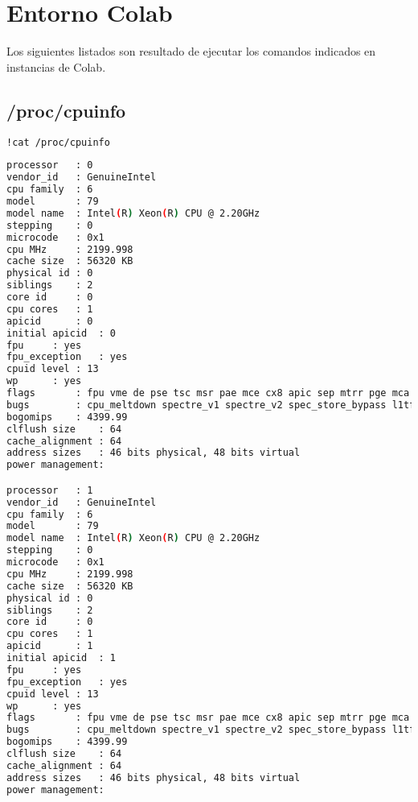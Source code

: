
\section{Entorno Colab}\label{app:colab}
Los siguientes listados son resultado de ejecutar los comandos indicados en instancias de Colab.

\subsection{/proc/cpuinfo}

\begin{lstlisting}[language=bash,tabsize=2,name=cpuinfo,frame=single]
!cat /proc/cpuinfo
\end{lstlisting}
\begin{lstlisting}[language=bash,name=cpuinfo,backgroundcolor=\color{Gray!20},lineskip=-1pt,basicstyle=\footnotesize]
processor	: 0
vendor_id	: GenuineIntel
cpu family	: 6
model		: 79
model name	: Intel(R) Xeon(R) CPU @ 2.20GHz
stepping	: 0
microcode	: 0x1
cpu MHz		: 2199.998
cache size	: 56320 KB
physical id	: 0
siblings	: 2
core id		: 0
cpu cores	: 1
apicid		: 0
initial apicid	: 0
fpu		: yes
fpu_exception	: yes
cpuid level	: 13
wp		: yes
flags		: fpu vme de pse tsc msr pae mce cx8 apic sep mtrr pge mca cmov pat pse36 clflush mmx fxsr sse sse2 ss ht syscall nx pdpe1gb rdtscp lm constant_tsc rep_good nopl xtopology nonstop_tsc cpuid tsc_known_freq pni pclmulqdq ssse3 fma cx16 pcid sse4_1 sse4_2 x2apic movbe popcnt aes xsave avx f16c rdrand hypervisor lahf_lm abm 3dnowprefetch invpcid_single ssbd ibrs ibpb stibp fsgsbase tsc_adjust bmi1 hle avx2 smep bmi2 erms invpcid rtm rdseed adx smap xsaveopt arat md_clear arch_capabilities
bugs		: cpu_meltdown spectre_v1 spectre_v2 spec_store_bypass l1tf mds swapgs taa
bogomips	: 4399.99
clflush size	: 64
cache_alignment	: 64
address sizes	: 46 bits physical, 48 bits virtual
power management:

processor	: 1
vendor_id	: GenuineIntel
cpu family	: 6
model		: 79
model name	: Intel(R) Xeon(R) CPU @ 2.20GHz
stepping	: 0
microcode	: 0x1
cpu MHz		: 2199.998
cache size	: 56320 KB
physical id	: 0
siblings	: 2
core id		: 0
cpu cores	: 1
apicid		: 1
initial apicid	: 1
fpu		: yes
fpu_exception	: yes
cpuid level	: 13
wp		: yes
flags		: fpu vme de pse tsc msr pae mce cx8 apic sep mtrr pge mca cmov pat pse36 clflush mmx fxsr sse sse2 ss ht syscall nx pdpe1gb rdtscp lm constant_tsc rep_good nopl xtopology nonstop_tsc cpuid tsc_known_freq pni pclmulqdq ssse3 fma cx16 pcid sse4_1 sse4_2 x2apic movbe popcnt aes xsave avx f16c rdrand hypervisor lahf_lm abm 3dnowprefetch invpcid_single ssbd ibrs ibpb stibp fsgsbase tsc_adjust bmi1 hle avx2 smep bmi2 erms invpcid rtm rdseed adx smap xsaveopt arat md_clear arch_capabilities
bugs		: cpu_meltdown spectre_v1 spectre_v2 spec_store_bypass l1tf mds swapgs taa
bogomips	: 4399.99
clflush size	: 64
cache_alignment	: 64
address sizes	: 46 bits physical, 48 bits virtual
power management:
\end{lstlisting}

